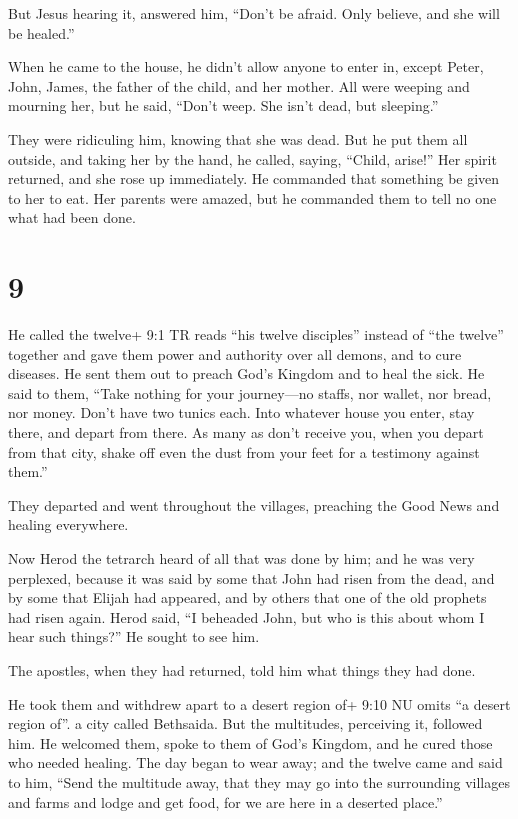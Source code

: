  But Jesus hearing it, answered him, ``Don't be afraid.
Only believe, and she will be healed.''

 When he came to the house, he didn't allow anyone to enter
in, except Peter, John, James, the father of the child, and her mother.
 All were weeping and mourning her, but he said, ``Don't
weep. She isn't dead, but sleeping.''

 They were ridiculing him, knowing that she was dead.
 But he put them all outside, and taking her by the hand,
he called, saying, ``Child, arise!''  Her spirit returned,
and she rose up immediately. He commanded that something be given to her
to eat.  Her parents were amazed, but he commanded them to
tell no one what had been done.

\hypertarget{section-8}{%
\section{9}\label{section-8}}

 He called the twelve+ 9:1 TR reads ``his twelve disciples''
instead of ``the twelve'' together and gave them power and authority
over all demons, and to cure diseases.  He sent them out to
preach God's Kingdom and to heal the sick.  He said to them,
``Take nothing for your journey---no staffs, nor wallet, nor bread, nor
money. Don't have two tunics each.  Into whatever house you
enter, stay there, and depart from there.  As many as don't
receive you, when you depart from that city, shake off even the dust
from your feet for a testimony against them.''

 They departed and went throughout the villages, preaching
the Good News and healing everywhere.

 Now Herod the tetrarch heard of all that was done by him;
and he was very perplexed, because it was said by some that John had
risen from the dead,  and by some that Elijah had appeared,
and by others that one of the old prophets had risen again. 
Herod said, ``I beheaded John, but who is this about whom I hear such
things?'' He sought to see him.

 The apostles, when they had returned, told him what things
they had done.

He took them and withdrew apart to a desert region of+ 9:10 NU omits ``a
desert region of''. a city called Bethsaida.  But the
multitudes, perceiving it, followed him. He welcomed them, spoke to them
of God's Kingdom, and he cured those who needed healing. 
The day began to wear away; and the twelve came and said to him, ``Send
the multitude away, that they may go into the surrounding villages and
farms and lodge and get food, for we are here in a deserted place.''

